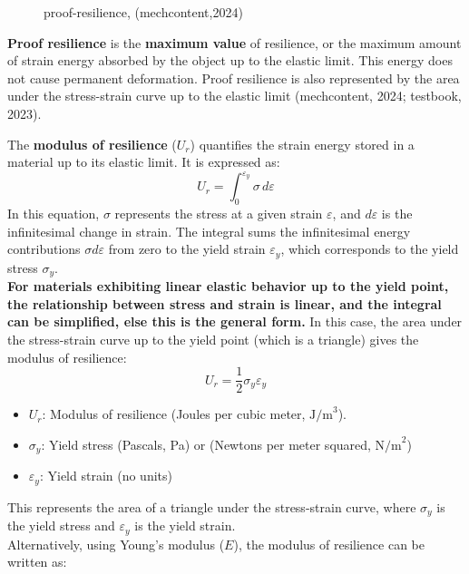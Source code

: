 \documentclass{article}
\begin{document}
{\begin{center}
\begin{minipage}[t]{0.46\textwidth}
\begin{figure}[H]
    \caption{proof-resilience, (mechcontent,2024)}
    \label{fig:proof-resilience}
\end{figure}
\textbf{Proof resilience} is the \textbf{maximum value} of resilience, or the maximum amount of strain energy absorbed by the object up to the elastic limit. This energy does not cause permanent deformation. Proof resilience is also represented by the area under the stress-strain curve up to the elastic limit (mechcontent, 2024; testbook, 2023).
\end{minipage}

\end{center}

The \textbf{modulus of resilience} ($U_r$) quantifies the strain energy stored in a material up to its elastic limit. It is expressed as:
\begin{equation}
    U_r = \int_0^{\varepsilon_y} \sigma \, d\varepsilon
\end{equation}
In this equation, $\sigma$ represents the stress at a given strain $\varepsilon$, and $d\varepsilon$ is the infinitesimal change in strain. The integral sums the infinitesimal energy contributions $\sigma d\varepsilon$ from zero to the yield strain $\varepsilon_y$, which corresponds to the yield stress $\sigma_y$.\\[8pt]
\textbf{For materials exhibiting linear elastic behavior up to the yield point, the relationship between stress and strain is linear, and the integral can be simplified, else this is the general form.} 
\newpage
In this case, the area under the stress-strain curve up to the yield point (which is a triangle) gives the modulus of resilience:
\begin{equation}
    U_r = \frac{1}{2} \sigma_y \varepsilon_y
\end{equation}
\begin{itemize}[itemsep=-1mm]
    \item \(U_r\): Modulus of resilience (Joules per cubic meter, \( \text{J/m}^3 \)).
    \item \( \sigma_y \): {Yield stress} (Pascals, Pa) or (Newtons per meter squared, \( \text{N/m}^2 \))
    \item \( \varepsilon_y \): {Yield strain} (no units)
\end{itemize}
This represents the area of a triangle under the stress-strain curve, where \( \sigma_y \) is the yield stress and \( \varepsilon_y \) is the yield strain.\\[8pt]
Alternatively, using Young's modulus (\( E \)), the modulus of resilience can be written as:
}
\end{document}
